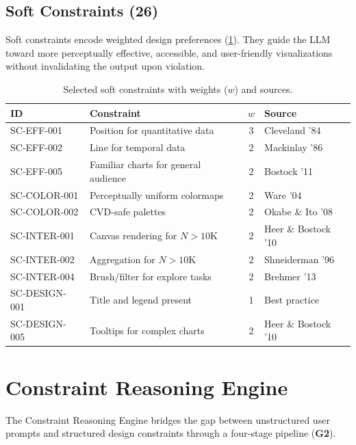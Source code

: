 \documentclass[final,5p,times,twocolumn]{elsarticle}
\begin{document}
\subsection{Soft Constraints (26)}

Soft constraints encode weighted design preferences (\cref{tab:soft_constraints}).
They guide the LLM toward more perceptually effective, accessible, and user-friendly visualizations without invalidating the output upon violation.

\begin{table}[!t]
\centering
\caption{Selected soft constraints with weights ($w$) and sources.}
\label{tab:soft_constraints}
\small
\begin{tabular}{@{}llcl@{}}
\toprule
\textbf{ID} & \textbf{Constraint} & $w$ & \textbf{Source} \\
\midrule
SC-EFF-001 & Position for quantitative data & 3 & Cleveland '84 \\
SC-EFF-002 & Line for temporal data & 2 & Mackinlay '86 \\
SC-EFF-005 & Familiar charts for general audience & 2 & Bostock '11 \\
SC-COLOR-001 & Perceptually uniform colormaps & 2 & Ware '04 \\
SC-COLOR-002 & CVD-safe palettes & 2 & Okabe \& Ito '08 \\
SC-INTER-001 & Canvas rendering for $N > 10$K & 2 & Heer \& Bostock '10 \\
SC-INTER-002 & Aggregation for $N > 10$K & 2 & Shneiderman '96 \\
SC-INTER-004 & Brush/filter for explore tasks & 2 & Brehmer '13 \\
SC-DESIGN-001 & Title and legend present & 1 & Best practice \\
SC-DESIGN-005 & Tooltips for complex charts & 2 & Heer \& Bostock '10 \\
\bottomrule
\end{tabular}
\end{table}


\section{Constraint Reasoning Engine}
\label{sec:engine}

The Constraint Reasoning Engine bridges the gap between unstructured user prompts and structured design constraints through a four-stage pipeline (\textbf{G2}).
\end{document}
